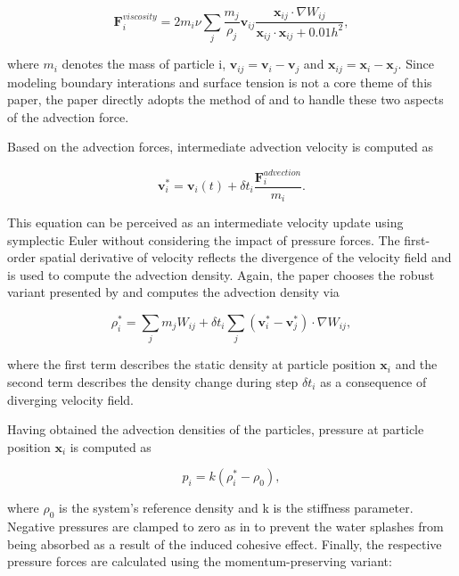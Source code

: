 \documentclass[
	11pt, 
	DIV10,
	ngerman,
	a4paper, 
	oneside, 
	headings=normal, 
	captions=tableheading,
	final, 
	numbers=noenddot
]{scrartcl}
\begin{document}
\begin{equation}
	\label{eq2}
	\boldsymbol{F}_{i}^{viscosity} = 2m_{i}\nu \sum_{j}\frac{m_{j}}{\rho_{j}}\boldsymbol{v}_{ij}\frac{\boldsymbol{x}_{ij} \cdot \nabla W_{ij}}{\boldsymbol{x}_{ij}\cdot \boldsymbol{x}_{ij} + 0.01h^{2}},
\end{equation}

where $m_{i}$ denotes the mass of particle i, $\boldsymbol{v}_{ij} = \boldsymbol{v}_{i} - \boldsymbol{v}_{j}$ and $\boldsymbol{x}_{ij} = \boldsymbol{x}_{i} - \boldsymbol{x}_{j}$. Since modeling boundary interations and surface tension is not a core theme of this paper, the paper directly adopts the method of \cite{akinci2012versatile} and \cite{huber2015evaluation} to handle these two aspects of the advection force.
\par
Based on the advection forces, intermediate advection velocity is computed as

\begin{equation}
	\label{eq3}
	\boldsymbol{v}_{i}^{*} = \boldsymbol{v}_{i}(t) + \delta t_{i}\frac{\boldsymbol{F}_{i}^{advection}}{m_{i}}.
\end{equation}

This equation can be perceived as an intermediate velocity update using symplectic Euler without considering the impact of pressure forces. The first-order spatial derivative of velocity reflects the divergence of the velocity field and is used to compute the advection density. Again, the paper chooses the robust variant presented by \cite{monaghan1992smoothed} and computes the advection density via

\begin{equation}
	\label{eq4}
	\rho_{i}^{*} = \sum_{j}m_{j}W_{ij} + \delta t_{i}\sum_{j}(\boldsymbol{v}_{i}^{*} - \boldsymbol{v}_{j}^{*})\cdot \nabla W_{ij},
\end{equation}

where the first term describes the static density at particle position $ \boldsymbol{x}_{i} $ and the second term describes the density change during step $ \delta t_{i} $ as a consequence of diverging velocity field.
\par
Having obtained the advection densities of the particles, pressure at particle position $ \boldsymbol{x}_{i} $ is computed as

\begin{equation}
	\label{eq8}
	p_{i} = k(\rho_{i}^{*} - \rho_{0}),
\end{equation}

where $ \rho_{0} $ is the system's reference density and k is the stiffness parameter. Negative pressures are clamped to zero as in \cite{ihmsen2013implicit} to prevent the water splashes from being absorbed as a result of the induced cohesive effect. Finally, the respective pressure forces are calculated using the momentum-preserving variant:
\end{document}
